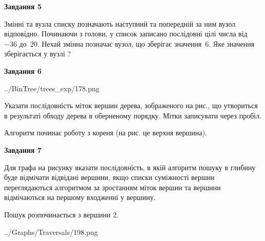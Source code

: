 \documentclass[12pt, ukrainian]{article}
\begin{document}
{\begin {large}
{\begin {center}\textbf{Завдання 5}\end {center}}\par
Змінні  та  вузла списку позначають наступний та попередній за ним вузол відповідно. Починаючи з голови, у список записано послідовні цілі числа від~$-36$ до~$20$. Нехай змінна  позначає вузол, що зберігає значення~$6$.
Яке значення зберігається у вузлі  ?\par
\newpage

{\begin {center}\textbf{Завдання 6}\end {center}}\par

\begin{center}
	{../BinTree/trees_exp/178.png}
\end{center}
Указати послідовність міток вершин дерева, зображеного на рис., що утвориться в результаті обходу дерева в оберненому порядку. Мітки записувати через пробіл.\par Алгоритм починає роботу з кореня (на рис. це верхня вершина).\par
\newpage

{\begin {center}\textbf{Завдання 7}\end {center}}\par
Для графа на рисунку вказати послідовність, в якій алгоритм пошуку в глибину буде відмічати відвідані вершини, якщо списки суміжності вершин переглядаються алгоритмом за зростанням міток вершин та вершини відмічаються на першому вход\-женні у вершину.\par
Пошук розпочинається з вершини 2.\par

\begin{center}
	{../Graphs/Traversals/198.png}
\end{center}\par
\newpage


\end{large}}
\end{document}
